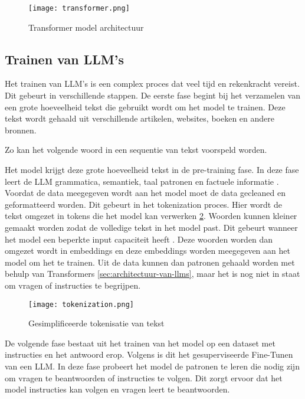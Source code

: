 \begin{figure}[h]
  \centering
  \texttt{[image: transformer.png]}
  \caption[Architectuur transformer model]{Transformer model architectuur \autocite{VaswaniEtAl2017}}
  \label{fig:transformer-model}
\end{figure}

\subsection{Trainen van LLM's}
\label{sec:trainen-van-llms}
Het trainen van LLM's is een complex proces dat veel tijd en rekenkracht vereist. Dit gebeurt in verschillende stappen.
De eerste fase begint bij het verzamelen van een grote hoeveelheid tekst die gebruikt wordt om het model te trainen.
Deze tekst wordt gehaald uit verschillende artikelen, websites, boeken en andere bronnen. 

Zo kan het volgende woord in een sequentie van tekst voorspeld worden.

Het model krijgt deze grote hoeveelheid tekst in de pre-training fase.
In deze fase leert de LLM grammatica, semantiek, taal patronen en factuele informatie \autocite{Cacic2023}.
Voordat de data meegegeven wordt aan het model moet de data gecleaned en geformatteerd worden.
Dit gebeurt in het tokenization proces. 
Hier wordt de tekst omgezet in tokens die het model kan verwerken \ref{fig:tokenization}.
Woorden kunnen kleiner gemaakt worden zodat de volledige tekst in het model past. 
Dit gebeurt wanneer het model een beperkte input capaciteit heeft \autocite{ElHousieny2023}.
Deze woorden worden dan omgezet wordt in embeddings en deze embeddings worden meegegeven aan het model om het te trainen.
Uit de data kunnen dan patronen gehaald worden met behulp van Transformers \ref{sec:architectuur-van-llms}, maar het is nog niet in staat om vragen of instructies te begrijpen.

\begin{figure}[h]
  \centering
  \texttt{[image: tokenization.png]}
  \caption[Tokenisatie van tekst]{Gesimplificeerde tokenisatie van tekst \autocite{TeeTracker2023}}
  \label{fig:tokenization}
\end{figure}

De volgende fase bestaat uit het trainen van het model op een dataset met instructies en het antwoord erop. 
Volgens \textcite{Das2024} is dit het gesuperviseerde Fine-Tunen van een LLM.
In deze fase probeert het model de patronen te leren die nodig zijn om vragen te beantwoorden of instructies te volgen.
Dit zorgt ervoor dat het model instructies kan volgen en vragen leert te beantwoorden.

